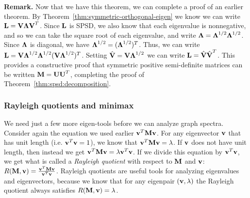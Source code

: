 \textbf{Remark.}
Now that we have this theorem, we can complete a proof of an earlier theorem. By Theorem~\ref{thm:symmetric-orthogonal-eigen} we know we can write $\textbf{L} = \textbf{V} \boldsymbol{\Lambda} \textbf{V}^T$. Since $\textbf{L}$ is SPSD, we also know that each eigenvalue is nonnegative, and so we can take the square root of each eigenvalue, and write $\boldsymbol{\Lambda} = \boldsymbol{\Lambda}^{1/2}\boldsymbol{\Lambda}^{1/2}$. Since $\boldsymbol{\Lambda}$ is diagonal, we have $\boldsymbol{\Lambda}^{1/2} = (\boldsymbol{\Lambda}^{1/2})^T$. Thus, we can write $\textbf{L} = \textbf{V}\boldsymbol{\Lambda}^{1/2} \boldsymbol{\Lambda}^{1/2} (\textbf{V}\boldsymbol{\Lambda}^{1/2})^T$.
Setting $\hat{\textbf{V}} = \textbf{V}\boldsymbol{\Lambda}^{1/2}$ we can write $\textbf{L} = \hat{\textbf{V}}\hat{\textbf{V}}^T$. This provides a constructive proof that symmetric positive semi-definite matrices can be written $\textbf{M} = \textbf{U}\textbf{U}^T$, completing the proof of Theorem~\ref{thm:spsd:decomposition}.


\subsubsection{Rayleigh quotients and minimax}
We need just a few more eigen-tools before we can analyze graph spectra. Consider again the equation we used earlier $\textbf{v}^T\textbf{M}\textbf{v}$. For any eigenvector $\textbf{v}$ that has unit length (i.e. $\textbf{v}^T\textbf{v} = 1$), we know that $\textbf{v}^T\textbf{M}\textbf{v} = \lambda$. If $\textbf{v}$ does not have unit length, then instead we get $\textbf{v}^T\textbf{M}\textbf{v} = \lambda \textbf{v}^T\textbf{v}$. If we divide this equation by $\textbf{v}^T\textbf{v}$, we get what is called a \emph{Rayleigh quotient} with respect to $\textbf{M}$ and $\textbf{v}$:  $R(\textbf{M},\textbf{v}) = \tfrac{\textbf{v}^T\textbf{M}\textbf{v}}{\textbf{v}^T\textbf{v}}$.
Rayleigh quotients are useful tools for analyzing eigenvalues and eigenvectors, because we know that for any eigenpair $(\textbf{v}, \lambda)$ the Rayleigh quotient always satisfies $R(\textbf{M}, \textbf{v}) = \lambda$.

